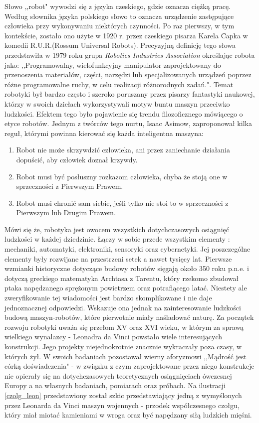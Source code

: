 Słowo ,,robot" wywodzi się z języka czeskiego, gdzie oznacza ciężką pracę. 
Według słownika języka polskiego słowo to oznacza urządzenie zastępujące człowieka przy wykonywaniu niektórych czynności. Po raz pierwszy, w tym kontekście, zostało ono użyte w 1920 r. przez czeskiego pisarza Karela \newtie{C}apka w komedii R.U.R.(Rossum Universal Robots)\cite{Czech}. Precyzyjną definicję tego słowa przedstawiła w 1979 roku grupa \textit{Robotics Industries Association} określając robota jako: ,,Programowalny, wielofunkcyjny manipulator zaprojektowany do przenoszenia materiałów, części, narzędzi lub specjalizowanych urządzeń poprzez różne programowalne ruchy, w celu realizacji różnorodnych zadań."\cite{def_robota}.
Temat robotyki był bardzo często i szeroko poruszany przez pisarzy fantastyki naukowej, którzy w swoich dziełach wykorzystywali motyw buntu maszyn przeciwko ludzkości. Efektem tego było pojawienie się trendu filozoficznego mówiącego o etyce robotów. Jednym z twórców tego nurtu, Isaac Asimow, zaproponował kilka reguł, którymi powinna kierować się każda inteligentna maszyna\cite{prawa_robota}:
\begin{enumerate}
\item Robot nie może skrzywdzić człowieka, ani przez zaniechanie działania dopuścić, aby człowiek doznał krzywdy.
\item Robot musi być posłuszny rozkazom człowieka, chyba że stoją one w sprzeczności z Pierwszym Prawem.
\item Robot musi chronić sam siebie, jeśli tylko nie stoi to w sprzeczności z Pierwszym lub Drugim Prawem.
\end{enumerate}
Mówi się że, robotyka jest owocem wszystkich dotychczasowych osiągnięć ludzkości w każdej dziedzinie. Łączy w sobie przede wszystkim elementy : mechaniki, automatyki, elektroniki, sensoryki oraz cybernetyki.
Jej poszczególne elementy były rozwijane na przestrzeni setek a nawet tysięcy lat. Pierwsze wzmianki historyczne dotyczące budowy robotów sięgają około 350 roku p.n.e. i dotyczą greckiego matematyka Archtasa z Tarentu, który rzekomo zbudował ptaka napędzanego sprężonym powietrzem oraz potrafiącego latać. Niestety ale zweryfikowanie tej wiadomości jest bardzo skomplikowane i nie daje jednoznacznej odpowiedzi. Wskazuje ona jednak na zainteresowanie ludzkości budową maszyn-robotów, które pierwotnie miały naśladować naturę. Za początek rozwoju robotyki uważa się przełom XV oraz XVI wieku, w którym za sprawą wielkiego wynalazcy - Leonadra da Vinci powstało wiele interesujących konstrukcji. Jego projekty niejednokrotnie znacznie wykraczały poza czasy, w których żył. W swoich badaniach pozostawał wierny aforyzmowi ,,Mądrość jest
córką doświadczenia" - w związku z czym zaprojektowane przez niego konstrukcje nie opierały się na dotychczasowych teoretycznych osiągnięciach ówczesnej Europy a na własnych badaniach, pomiarach oraz próbach\cite{da_vinci}.  Na ilustracji \ref{czolg_leon} przedstawiony został szkic przedstawiający jedną z wymyślonych przez Leonarda da Vinci maszyn wojennych - przodek współczesnego czołgu, który miał miotać kamieniami w wroga oraz być napędzany siłą ludzkich mięśni.

